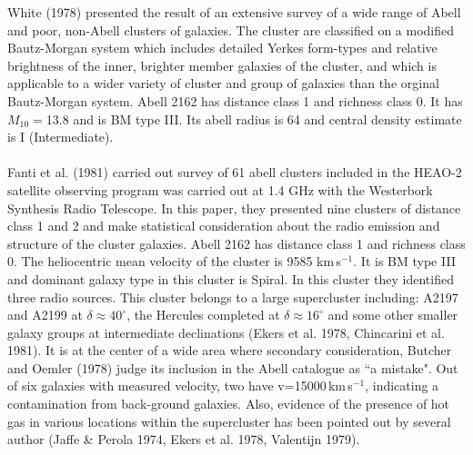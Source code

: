 White (1978) presented the result of an extensive survey of a wide range of Abell and poor, non-Abell clusters of galaxies. The cluster are classified on a modified Bautz-Morgan system which includes detailed Yerkes form-types and relative brightness of the inner, brighter member galaxies of the cluster, and which is applicable to a wider variety of cluster and group of galaxies than the orginal Bautz-Morgan system. Abell 2162 has distance class 1 and richness class 0. It has $M_{10}=$13.8 and is BM type III. Its abell radius is 64 and central density estimate is I (Intermediate).\\\\
Fanti et al. (1981) carried out survey of 61 abell clusters included in the HEAO-2 satellite observing program was carried out at 1.4 GHz with the Westerbork Synthesis Radio Telescope. In this paper, they presented nine clusters of distance class 1 and 2 and make statistical consideration about the radio emission and structure of the cluster galaxies. Abell 2162 has distance class 1 and richness class 0. The heliocentric mean velocity of the cluster is 9585 km\,s$^{-1}$. It is BM type III and dominant galaxy type in this cluster is Spiral. In this cluster they identified three radio sources. This cluster belongs to a large supercluster including: A2197 and A2199 at $\delta\approx 40^\circ$, the Hercules completed at $\delta\approx 16^\circ$ and some other smaller galaxy groups at intermediate declinations (Ekers et al. 1978, Chincarini et al. 1981). It is at the center of a wide area where secondary consideration, Butcher and Oemler (1978) judge its inclusion in the Abell catalogue as ``a mistake". Out of six galaxies with measured velocity, two have v=15000\,km\,s$^{-1}$, indicating a contamination from back-ground galaxies. Also, evidence of the presence of hot gas in various locations within the supercluster has been pointed out by several author (Jaffe \& Perola 1974, Ekers et al. 1978, Valentijn 1979).